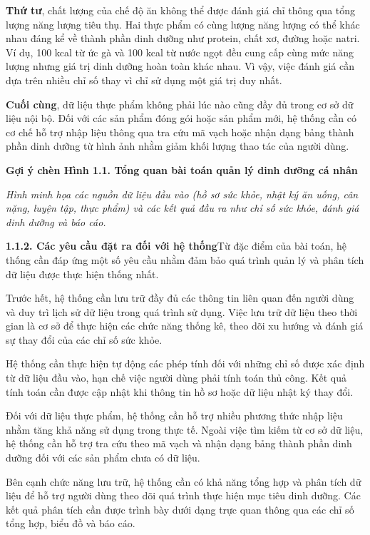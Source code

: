 \textbf{Thứ tư}, chất lượng của chế độ ăn không thể được đánh giá chỉ thông qua tổng lượng năng lượng tiêu thụ. Hai thực phẩm có cùng lượng năng lượng có thể khác nhau đáng kể về thành phần dinh dưỡng như protein, chất xơ, đường hoặc natri. Ví dụ, 100 kcal từ ức gà và 100 kcal từ nước ngọt đều cung cấp cùng mức năng lượng nhưng giá trị dinh dưỡng hoàn toàn khác nhau. Vì vậy, việc đánh giá cần dựa trên nhiều chỉ số thay vì chỉ sử dụng một giá trị duy nhất.

\textbf{Cuối cùng}, dữ liệu thực phẩm không phải lúc nào cũng đầy đủ trong cơ sở dữ liệu nội bộ. Đối với các sản phẩm đóng gói hoặc sản phẩm mới, hệ thống cần có cơ chế hỗ trợ nhập liệu thông qua tra cứu mã vạch hoặc nhận dạng bảng thành phần dinh dưỡng từ hình ảnh nhằm giảm khối lượng thao tác của người dùng.

\textbf{Gợi ý chèn Hình 1.1. Tổng quan bài toán quản lý dinh dưỡng cá nhân}

\textit{Hình minh họa các nguồn dữ liệu đầu vào (hồ sơ sức khỏe, nhật ký ăn uống, cân nặng, luyện tập, thực phẩm) và các kết quả đầu ra như chỉ số sức khỏe, đánh giá dinh dưỡng và báo cáo.}

\textbf{1.1.2. Các yêu cầu đặt ra đối với hệ thống}Từ đặc điểm của bài toán, hệ thống cần đáp ứng một số yêu cầu nhằm đảm bảo quá trình quản lý và phân tích dữ liệu được thực hiện thống nhất.

Trước hết, hệ thống cần lưu trữ đầy đủ các thông tin liên quan đến người dùng và duy trì lịch sử dữ liệu trong quá trình sử dụng. Việc lưu trữ dữ liệu theo thời gian là cơ sở để thực hiện các chức năng thống kê, theo dõi xu hướng và đánh giá sự thay đổi của các chỉ số sức khỏe.

Hệ thống cần thực hiện tự động các phép tính đối với những chỉ số được xác định từ dữ liệu đầu vào, hạn chế việc người dùng phải tính toán thủ công. Kết quả tính toán cần được cập nhật khi thông tin hồ sơ hoặc dữ liệu nhật ký thay đổi.

Đối với dữ liệu thực phẩm, hệ thống cần hỗ trợ nhiều phương thức nhập liệu nhằm tăng khả năng sử dụng trong thực tế. Ngoài việc tìm kiếm từ cơ sở dữ liệu, hệ thống cần hỗ trợ tra cứu theo mã vạch và nhận dạng bảng thành phần dinh dưỡng đối với các sản phẩm chưa có dữ liệu.

Bên cạnh chức năng lưu trữ, hệ thống cần có khả năng tổng hợp và phân tích dữ liệu để hỗ trợ người dùng theo dõi quá trình thực hiện mục tiêu dinh dưỡng. Các kết quả phân tích cần được trình bày dưới dạng trực quan thông qua các chỉ số tổng hợp, biểu đồ và báo cáo.

